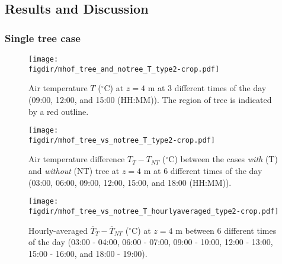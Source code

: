 \subsection{Results and Discussion}

\subsubsection{Single tree case}

\begin{figure}[p]
	\centering
	\texttt{[image: \\figdir/mhof\_tree\_and\_notree\_T\_type2-crop.pdf]}
	\caption{Air temperature $T$ ($^{\circ}$C) at $z=4$ m at 3 different times of the day (09:00, 12:00, and 15:00 (HH:MM)). The region of tree is indicated by a red outline.}
	\label{fig:T_muensterhof}
\end{figure}

\begin{figure}[p]
	\centering
	\texttt{[image: \\figdir/mhof\_tree\_vs\_notree\_T\_type2-crop.pdf]}
	\caption{Air temperature difference $T_{T}-T_{\textit{NT}}$ ($^{\circ}$C) between the cases \textit{with} (T) and \textit{without} (NT) tree at $z=4$ m at 6 different times of the day (03:00, 06:00, 09:00, 12:00, 15:00, and 18:00 (HH:MM)).}
	\label{fig:Tdiff_muensterhof}
\end{figure}

\begin{figure}[p]
	\centering
	\texttt{[image: \\figdir/mhof\_tree\_vs\_notree\_T\_hourlyaveraged\_type2-crop.pdf]}
	\caption{Hourly-averaged $\overline{T}_{T}-\overline{T}_{\textit{NT}}$ ($^{\circ}$C) at $z=4$ m between 6 different times of the day (03:00 - 04:00, 06:00 - 07:00, 09:00 - 10:00, 12:00 - 13:00, 15:00 - 16:00, and 18:00 - 19:00).}
	\label{fig:Tdiff_muensterhof_hourly}
\end{figure}

